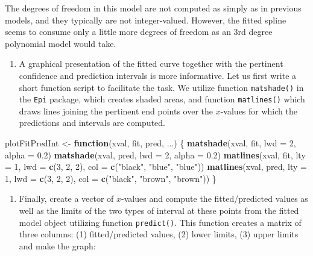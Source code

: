 \documentclass[
]{book}
\newenvironment{Shaded}{\begin{snugshade}}{\end{snugshade}}
\newcommand{\AttributeTok}[1]{\textcolor[rgb]{0.13,0.29,0.53}{#1}}
\newcommand{\ControlFlowTok}[1]{\textcolor[rgb]{0.13,0.29,0.53}{\textbf{#1}}}
\newcommand{\DecValTok}[1]{\textcolor[rgb]{0.00,0.00,0.81}{#1}}
\newcommand{\FloatTok}[1]{\textcolor[rgb]{0.00,0.00,0.81}{#1}}
\newcommand{\FunctionTok}[1]{\textcolor[rgb]{0.13,0.29,0.53}{\textbf{#1}}}
\newcommand{\NormalTok}[1]{#1}
\newcommand{\OtherTok}[1]{\textcolor[rgb]{0.56,0.35,0.01}{#1}}
\newcommand{\StringTok}[1]{\textcolor[rgb]{0.31,0.60,0.02}{#1}}
\providecommand{\tightlist}{%
  \setlength{\itemsep}{0pt}\setlength{\parskip}{0pt}}
\begin{document}
The degrees of freedom in this model are not
computed as simply as in previous
models, and they typically are not integer-valued. However,
the fitted spline seems to consume only a little more degrees of freedom
as an 3rd degree polynomial model would take.

\begin{enumerate}
\def\labelenumi{\arabic{enumi}.}
\setcounter{enumi}{1}
\tightlist
\item
  A graphical presentation of the fitted curve together with the
  pertinent confidence and prediction intervals is more informative.
  Let us first write a
  short function script to facilitate the task. We utilize function
  \texttt{matshade()} in the \texttt{Epi} package, which creates shaded areas,
  and function \texttt{matlines()} which draws
  lines joining the pertinent end points over the \(x\)-values
  for which the predictions and intervals are computed.
\end{enumerate}

\begin{Shaded}
\begin{Highlighting}[]
\NormalTok{plotFitPredInt }\OtherTok{\textless{}{-}} \ControlFlowTok{function}\NormalTok{(xval, fit, pred, ...) \{}
  \FunctionTok{matshade}\NormalTok{(xval, fit, }\AttributeTok{lwd =} \DecValTok{2}\NormalTok{, }\AttributeTok{alpha =} \FloatTok{0.2}\NormalTok{)}
  \FunctionTok{matshade}\NormalTok{(xval, pred, }\AttributeTok{lwd =} \DecValTok{2}\NormalTok{, }\AttributeTok{alpha =} \FloatTok{0.2}\NormalTok{)}
  \FunctionTok{matlines}\NormalTok{(xval, fit, }\AttributeTok{lty =} \DecValTok{1}\NormalTok{, }\AttributeTok{lwd =} \FunctionTok{c}\NormalTok{(}\DecValTok{3}\NormalTok{, }\DecValTok{2}\NormalTok{, }\DecValTok{2}\NormalTok{), }\AttributeTok{col =} \FunctionTok{c}\NormalTok{(}\StringTok{"black"}\NormalTok{, }\StringTok{"blue"}\NormalTok{, }\StringTok{"blue"}\NormalTok{))}
  \FunctionTok{matlines}\NormalTok{(xval, pred, }\AttributeTok{lty =} \DecValTok{1}\NormalTok{, }\AttributeTok{lwd =} \FunctionTok{c}\NormalTok{(}\DecValTok{3}\NormalTok{, }\DecValTok{2}\NormalTok{, }\DecValTok{2}\NormalTok{), }\AttributeTok{col =} \FunctionTok{c}\NormalTok{(}\StringTok{"black"}\NormalTok{, }\StringTok{"brown"}\NormalTok{, }\StringTok{"brown"}\NormalTok{))}
\NormalTok{\}}
\end{Highlighting}
\end{Shaded}

\begin{enumerate}
\def\labelenumi{\arabic{enumi}.}
\setcounter{enumi}{2}
\tightlist
\item
  Finally, create a vector of \(x\)-values and compute
  the fitted/predicted values as well
  as the limits of the two types of interval
  at these points from the fitted model object utilizing
  function \texttt{predict()}.
  This function creates a matrix of three columns: (1) fitted/predicted
  values, (2) lower limits, (3) upper limits and
  make the graph:
\end{enumerate}
\end{document}
